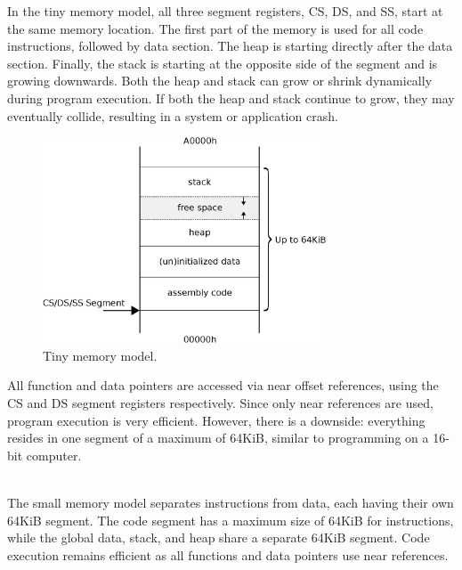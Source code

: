 \documentclass[book.tex]{subfiles}
\begin{document}
In the tiny memory model, all three segment registers, CS, DS, and SS, start at the same memory location. The first part of the memory is used for all code instructions, followed by data section. The heap is starting directly after the data section. Finally, the stack is starting at the opposite side of the segment and is growing downwards. Both the heap and stack can grow or shrink dynamically during program execution. If both the heap and stack continue to grow, they may eventually collide, resulting in a system or application crash.

\begin{figure}[H]
\centering
\includegraphics[width=0.75\textwidth]{imgs/drawings/memory/tiny_mm.eps}
\caption{Tiny memory model.}
\label{fig:mm_tiny}
\end{figure}
\par


All function and data pointers are accessed via near offset references, using the CS and DS segment registers respectively. Since only near references are used, program execution is very efficient. However, there is a downside: everything resides in one segment of a maximum of 64KiB, similar to programming on a 16-bit computer.\\

\\

\par
The small memory model separates instructions from data, each having their own 64KiB segment. The code segment has a maximum size of 64KiB for instructions, while the global data, stack, and heap share a separate 64KiB segment. Code execution remains efficient as all functions and data pointers use near references.
\end{document}
